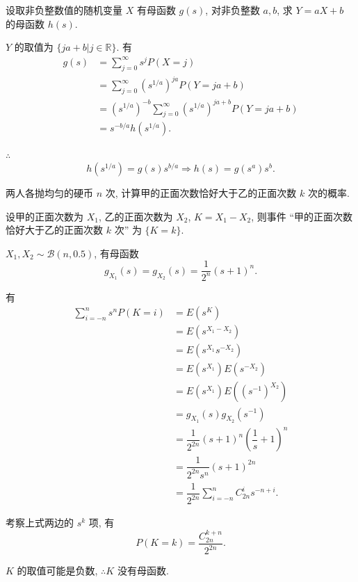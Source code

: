 \documentclass[color=black,device=normal,lang=cn]{elegantnote}
\numberwithin{equation}{section}
\theoremstyle{plain}
\numberwithin{exercise}{exsection}
\begin{document}
\begin{exercise}%
    设取非负整数值的随机变量 $X$ 有母函数 $g(s)$, 对非负整数 $a,b$, 求 $Y=aX+b$ 的母函数 $h(s)$.
\end{exercise}
\begin{solution}
    $Y$ 的取值为 $\{ja+b|j\in\mathbb{R}\}$. 有
    \begin{align*}
        g(s) & =\sum\limits_{j=0}^\infty s^jP(X=j) \\
        & =\sum\limits_{j=0}^\infty(s^{1/a})^{ja}P(Y=ja+b) \\
        & =(s^{1/a})^{-b}\sum\limits_{j=0}^\infty(s^{1/a})^{ja+b}P(Y=ja+b) \\
        & =s^{-b/a}h(s^{1/a}).
    \end{align*}

    $\therefore$
    \[h(s^{1/a})=g(s)s^{b/a}\Rightarrow h(s)=g(s^a)s^b.\]
\end{solution}
\addtocounter{exercise}{2}
\begin{exercise}%
    两人各抛均匀的硬币 $n$ 次, 计算甲的正面次数恰好大于乙的正面次数 $k$ 次的概率.
\end{exercise}
\begin{solution}
    设甲的正面次数为 $X_1$, 乙的正面次数为 $X_2$, $K=X_1-X_2$, 则事件 ``甲的正面次数恰好大于乙的正面次数 $k$ 次'' 为 $\{K=k\}$.

    $X_1,X_2\sim\mathcal{B}(n,0.5)$, 有母函数
    \[g_{X_1}(s)=g_{X_2}(s)=\dfrac{1}{2^n}(s+1)^n.\]

    有
    \begin{align*}
        \sum\limits_{i=-n}^ns^nP(K=i) & =E(s^K) \\
        & =E(s^{X_1-X_2}) \\
        & =E(s^{X_1}s^{-X_2}) \\
        & =E(s^{X_1})E(s^{-X_2}) \\
        & =E(s^{X_1})E((s^{-1})^{X_2}) \\
        & =g_{X_1}(s)g_{X_2}(s^{-1}) \\
        & =\dfrac{1}{2^{2n}}(s+1)^n\left(\dfrac{1}{s}+1\right)^n \\
        & =\dfrac{1}{2^{2n}s^n}(s+1)^{2n} \\
        & =\dfrac{1}{2^{2n}}\sum\limits_{i=-n}^nC_{2n}^is^{-n+i}.
    \end{align*}

    考察上式两边的 $s^k$ 项, 有
    \[P(K=k)=\dfrac{C_{2n}^{k+n}}{2^{2n}}.\]
\end{solution}
\begin{note}
    $K$ 的取值可能是负数, $\therefore K$ 没有母函数.
\end{note}
\addtocounter{exercise}{4}
\end{document}
